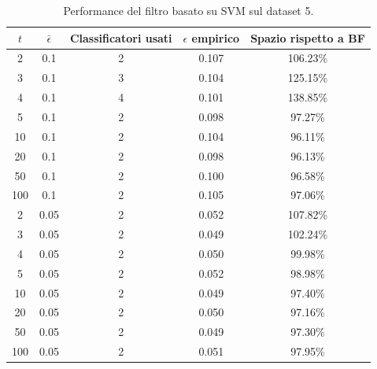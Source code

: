 \begin{table}
    \centering
    \begin{tabular}{|c|c|c|c|c|}
        \hline
        $t$ & $\bar\epsilon$ & Classificatori usati & $\epsilon$ empirico & Spazio rispetto a BF \\ 
        \hline
        2  & 0.1  & 2  & 0.107 & 106.23\% \\  
        3  & 0.1  & 3  & 0.104 & 125.15\% \\  
        4  & 0.1  & 4  & 0.101 & 138.85\% \\  
        5  & 0.1  & 2  & 0.098 & 97.27\% \\  
        10 & 0.1  & 2  & 0.104 & 96.11\% \\ 
        20 & 0.1  & 2  & 0.098 & 96.13\% \\ 
        50 & 0.1  & 2  & 0.100 & 96.58\% \\ 
        100 & 0.1 & 2  & 0.105 & 97.06\% \\  
        2  & 0.05 & 2  & 0.052 & 107.82\% \\  
        3  & 0.05 & 2  & 0.049 & 102.24\% \\  
        4  & 0.05 & 2  & 0.050 & 99.98\% \\  
        5  & 0.05 & 2  & 0.052 & 98.98\% \\  
        10 & 0.05 & 2  & 0.049 & 97.40\% \\ 
        20 & 0.05 & 2  & 0.050 & 97.16\% \\ 
        50 & 0.05 & 2  & 0.049 & 97.30\% \\ 
        100 & 0.05 & 2  & 0.051 & 97.95\% \\  
        \hline
    \end{tabular}
    \caption{Performance del filtro basato su SVM sul dataset 5.}
    \label{tab:performance-ds5-svm}
\end{table}
